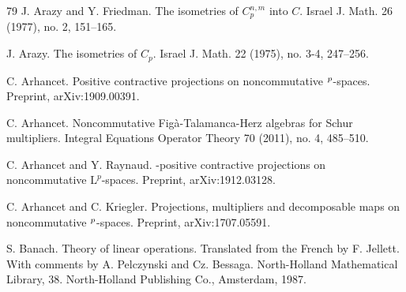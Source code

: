\documentclass[leqno]{article} %
\let\L\relax
\newcommand{\L}{\mathrm{L}}
\numberwithin{equation}{section}
\begin{document}
\begin{thebibliography}{79}
J. Arazy and Y. Friedman.
\newblock The isometries of $C_p^{n,m}$ into $C$.
\newblock Israel J. Math. 26 (1977), no. 2, 151--165.

J. Arazy.
\newblock The isometries of $C_p$.
\newblock Israel J. Math. 22 (1975), no. 3-4, 247--256.


C. Arhancet.
\newblock Positive contractive projections on noncommutative $\L^p$-spaces.
\newblock Preprint, arXiv:1909.00391.


C. Arhancet.
\newblock Noncommutative Fig\`a-Talamanca-Herz algebras for Schur multipliers.
\newblock Integral Equations Operator Theory 70 (2011), no. 4, 485--510. 

C. Arhancet and Y. Raynaud.
-positive contractive projections on noncommutative $\mathrm{L}^p$-spaces.
\newblock Preprint, arXiv:1912.03128.

C. Arhancet and C. Kriegler.
\newblock Projections, multipliers and decomposable maps on noncommutative $\L^p$-spaces.
\newblock Preprint, arXiv:1707.05591.




S. Banach.
\newblock Theory of linear operations. Translated from the French by F. Jellett. With comments by A. Pelczynski and Cz. Bessaga. 
\newblock North-Holland Mathematical Library, 38. North-Holland Publishing Co., Amsterdam, 1987. 



\end{thebibliography}
\end{document}
